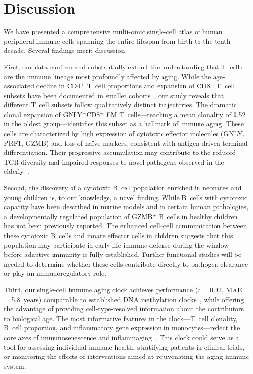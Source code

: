 \documentclass[11pt]{article}
\begin{document}
\section{Discussion}

We have presented a comprehensive multi-omic single-cell atlas of human peripheral immune cells spanning the entire lifespan from birth to the tenth decade. Several findings merit discussion.

First, our data confirm and substantially extend the understanding that T~cells are the immune lineage most profoundly affected by aging. While the age-associated decline in CD4$^+$ T~cell proportions and expansion of CD8$^+$ T~cell subsets have been documented in smaller cohorts~\citep{goronzy2013understanding,nikolich2014aging}, our study reveals that different T~cell subsets follow qualitatively distinct trajectories. The dramatic clonal expansion of GNLY$^+$CD8$^+$ EM T~cells---reaching a mean clonality of 0.52 in the oldest group---identifies this subset as a hallmark of immune aging. These cells are characterized by high expression of cytotoxic effector molecules (GNLY, PRF1, GZMB) and loss of na\"ive markers, consistent with antigen-driven terminal differentiation. Their progressive accumulation may contribute to the reduced TCR diversity and impaired responses to novel pathogens observed in the elderly~\citep{qi2014diversity,britanova2014age}.

Second, the discovery of a cytotoxic B~cell population enriched in neonates and young children is, to our knowledge, a novel finding. While B~cells with cytotoxic capacity have been described in murine models and in certain human pathologies, a developmentally regulated population of GZMB$^+$ B~cells in healthy children has not been previously reported. The enhanced cell--cell communication between these cytotoxic B~cells and innate effector cells in children suggests that this population may participate in early-life immune defense during the window before adaptive immunity is fully established. Further functional studies will be needed to determine whether these cells contribute directly to pathogen clearance or play an immunoregulatory role.

Third, our single-cell immune aging clock achieves performance ($r = 0.92$, MAE = 5.8~years) comparable to established DNA methylation clocks~\citep{horvath2013dna,hannum2013genome}, while offering the advantage of providing cell-type-resolved information about the contributors to biological age. The most informative features in the clock---T~cell clonality, B~cell proportion, and inflammatory gene expression in monocytes---reflect the core axes of immunosenescence and inflammaging~\citep{franceschi2000inflammaging}. This clock could serve as a tool for assessing individual immune health, stratifying patients in clinical trials, or monitoring the effects of interventions aimed at rejuvenating the aging immune system.
\end{document}
